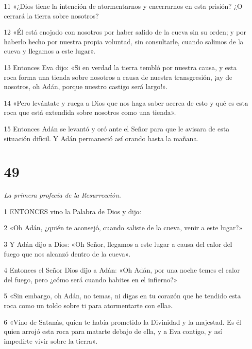 \par 11 «¿Dios tiene la intención de atormentarnos y encerrarnos en esta prisión? ¿O cerrará la tierra sobre nosotros?

\par 12 «Él está enojado con nosotros por haber salido de la cueva sin su orden; y por haberlo hecho por nuestra propia voluntad, sin consultarle, cuando salimos de la cueva y llegamos a este lugar».

\par 13 Entonces Eva dijo: «Si en verdad la tierra tembló por nuestra causa, y esta roca forma una tienda sobre nosotros a causa de nuestra transgresión, ¡ay de nosotros, oh Adán, porque nuestro castigo será largo!».

\par 14 «Pero levántate y ruega a Dios que nos haga saber acerca de esto y qué es esta roca que está extendida sobre nosotros como una tienda».

\par 15 Entonces Adán se levantó y oró ante el Señor para que le avisara de esta situación difícil. Y Adán permaneció así orando hasta la mañana.

\chapter{49}

\par \textit{La primera profecía de la Resurrección.}

\par 1 ENTONCES vino la Palabra de Dios y dijo:

\par 2 «Oh Adán, ¿quién te aconsejó, cuando saliste de la cueva, venir a este lugar?»

\par 3 Y Adán dijo a Dios: «Oh Señor, llegamos a este lugar a causa del calor del fuego que nos alcanzó dentro de la cueva».

\par 4 Entonces el Señor Dios dijo a Adán: «Oh Adán, por una noche temes el calor del fuego, pero ¿cómo será cuando habites en el infierno?»

\par 5 «Sin embargo, oh Adán, no temas, ni digas en tu corazón que he tendido esta roca como un toldo sobre ti para atormentarte con ella».

\par 6 «Vino de Satanás, quien te había prometido la Divinidad y la majestad. Es él quien arrojó esta roca para matarte debajo de ella, y a Eva contigo, y así impedirte vivir sobre la tierra».

